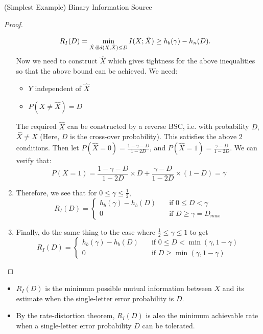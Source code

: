 \documentclass[../main.tex]{subfiles}
\begin{document}
\begin{pbox}{(Simplest Example) Binary Information Source}
\begin{proof}
\begin{enumerate}
\begin{align*}
                R_I(D) &= \min_{\hat X:\mathbb{E} d(X,\hat X)\leq D} I(X;\hat X)\geq h_b(\gamma) - h_n(D).
            \end{align*}
            Now we need to construct $\hat X$ which gives tightness for the above inequalities so that the above bound can be achieved. We need: \begin{itemize}
                \item $Y$ independent of $\hat X$
                \item $P(X\neq \hat X) = D$
            \end{itemize}
            The required $\hat X$ can be constructed by a reverse BSC, i.e. with probability $D,$ $\hat X\neq X$ (Here, $D$ is the cross-over probability). This satisfies the above 2 conditions.
            \newline
            Then let $P(\hat X=0) = \frac{1-\gamma-D}{1-2D}$, and $P(\hat X=1)=\frac{\gamma -D}{1-2D}$.
            \newline
            We can verify that: \[
            P(X=1)=\frac{1-\gamma-D}{1-2D} \times D + \frac{\gamma -D}{1-2D} \times (1-D) = \gamma
            \]
            \item Therefore, we see that for $0\leq \gamma \leq \frac{1}{2},$
            \[
            R_I(D)=\begin{cases}
        h_b(\gamma) - h_b(D) \quad &\text{if $0\leq D < \gamma$}\\
        0 \quad &\text{if $D \geq \gamma = D_{max}$}
    \end{cases}
            \]
            \item Finally, do the same thing to the case where $\frac{1}{2} \leq \gamma \leq 1$ to get \[
            R_I(D)=\begin{cases}
        h_b(\gamma) - h_b(D) \quad &\text{if $0\leq D < \min(\gamma,1-\gamma)$}\\
        0 \quad &\text{if $D \geq \min(\gamma, 1-\gamma)$}
    \end{cases}
            \]
        \end{enumerate}
    \end{proof}
    \begin{remark}
        \begin{itemize}
            \item $R_I(D)$ is the minimum possible mutual information between $X$ and its estimate when the single-letter error probability is $D$.
            \item By the rate-distortion theorem, $R_I(D)$ is also the minimum achievable rate when a single-letter error probability $D$ can be tolerated.
        \end{itemize}
    \end{remark}
\end{pbox}
\end{document}
